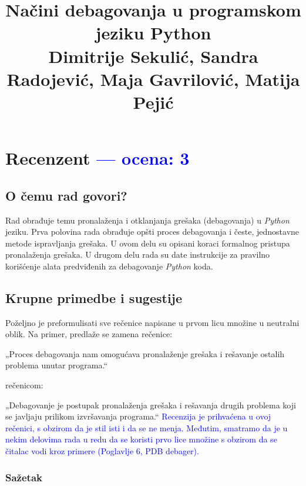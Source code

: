 \documentclass[a4paper]{report}
\newcommand{\odgovor}[1]{\textcolor{blue}{#1}}
\begin{document}
\title{Načini debagovanja u programskom jeziku Python\\ \small{Dimitrije Sekulić, Sandra Radojević, Maja Gavrilović, Matija Pejić}}

\maketitle

\tableofcontents

\chapter{Recenzent \odgovor{--- ocena: 3} }


\section{O čemu rad govori?}
Rad obrađuje temu pronalaženja i otklanjanja grešaka (debagovanja) u \emph{Python} jeziku. Prva polovina rada obrađuje opšti proces debagovanja i česte, jednostavne metode ispravljanja grešaka. U ovom delu su opisani koraci formalnog pristupa pronalaženja grešaka. U drugom delu rada su date instrukcije za pravilno korišćenje alata predviđenih za debagovanje \emph{Python} koda.

\section{Krupne primedbe i sugestije}
Poželjno je preformulisati sve rečenice napisane u prvom licu množine u neutralni oblik.
Na primer, predlaže se zamena rečenice:

„Proces debagovanja nam omogućava pronalaženje grešaka i rešavanje ostalih problema unutar programa.“

rečenicom:

„Debagovanje je postupak pronalaženja grešaka i rešavanja drugih problema koji se javljaju prilikom izvršavanja programa.“
\odgovor{Recenzija je prihvaćena u ovoj rečenici, s obzirom da je stil isti i da se ne menja. Međutim, smatramo da je u nekim delovima rada u redu da se koristi prvo lice množine s obzirom da se čitalac vodi kroz primere (Poglavlje 6, PDB debager). }
\subsection{Sažetak}
\end{document}
